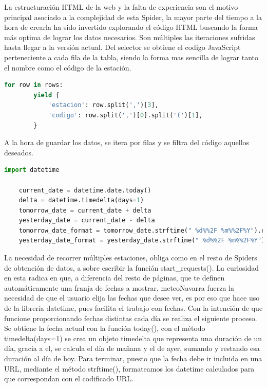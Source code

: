 La estructuración HTML de la web y la falta de experiencia son el motivo principal asociado a la complejidad de esta Spider, la mayor parte del tiempo a la hora de crearla ha sido invertido explorando el código HTML buscando la forma más optima de lograr los datos necesarios. Son múltiples las iteraciones sufridas hasta llegar a la versión actual.\newline
\newline
Del selector se obtiene el codigo JavaScript perteneciente a cada fila de la tabla, siendo la forma mas sencilla de lograr tanto el nombre como el código de la estación.

\begin{lstlisting}[language=Python, caption={Guardado de datos de MeteoNavarra Code Spider}]	
	for row in rows:
		yield {
			'estacion': row.split(',')[3],
			'codigo': row.split(',')[0].split('(')[1],
		}
\end{lstlisting}

A la hora de guardar los datos, se itera por filas y se filtra del código aquellos deseados.

\begin{lstlisting}[language=Python, caption={Uso de fechas en función start\_requests() MeteoNavarra Data Spider}]
	import datetime

	current_date = datetime.date.today()
	delta = datetime.timedelta(days=1)
	tomorrow_date = current_date + delta
	yesterday_date = current_date - delta
	tomorrow_date_format = tomorrow_date.strftime(" %d%%2F %m%%2F%Y").replace(' 0', '')
	yesterday_date_format = yesterday_date.strftime(" %d%%2F %m%%2F%Y").replace(' 0', '')
\end{lstlisting}

La necesidad de recorrer múltiples estaciones, obliga como en el resto de Spiders de obtención de datos, a sobre escribir la función start\_requests().\newline
\newline
La curiosidad en esta radica en que, a diferencia del resto de páginas, que te definen automáticamente una franja de fechas a mostrar, meteoNavarra fuerza la necesidad de que el usuario elija las fechas que desee ver, es por eso que hace uso de la librería datetime, pues facilita el trabajo con fechas.\newline
\newline
Con la intención de que funcione proporcionando fechas distintas cada día se realiza el siguiente proceso. Se obtiene la fecha actual con la función today(), con el método timedelta(days=1) se crea un objeto timedelta que representa una duración de un día, gracia a el, se calcula el día de mañana y el de ayer, sumando y restando esa duración al día de hoy. Para terminar, puesto que la fecha debe ir incluida en una URL, mediante el método strftime(), formateamos los datetime calculados para que correspondan con el codificado URL.\newline
\newline

